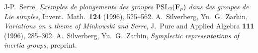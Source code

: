 \documentclass{amsart}
\theoremstyle{definition}
\begin{document}
\begin{thebibliography}{99}
 J-P.\ Serre, {\em Exemples de plongements des 
groupes ${\rm PSL}\sb 2({\bf F}\sb p)$ dans des groupes de 
Lie simples}, Invent.\ Math.\ 
{\bf 124} (1996), 525--562.
 A.\ Silverberg, Yu.\ G.\ Zarhin, 
{\em Variations on a theme of Minkowski and Serre},
J.\ Pure and Applied Algebra {\bf 111}  (1996),  285--302.
 A.\ Silverberg, Yu.\ G.\ Zarhin, 
{\em Symplectic representations of inertia groups}, 
preprint.

\end{thebibliography}
\end{document}
